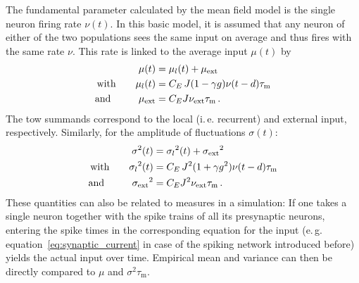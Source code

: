 The fundamental parameter calculated by the mean field model is the single neuron
firing rate $\nu(t)$. In this basic model, it is assumed that any neuron of either 
of the two populations sees the same input on average and thus fires with the same 
rate $\nu$. This rate is linked to the average input $\mu(t)$ by
\begin{equation}
    \begin{split}
        \mu(t)          &= \mu_l(t) + \mu_\text{ext} \\
        \text{with} \qquad \mu_l(t)        &= C_E \, J (1 - \gamma g) \nu(t - d) \tau_\text{m} \\
        \text{and~~\,} \qquad \mu_\text{ext}  &= C_E J \nu_\text{ext} \tau_\text{m} \,.
        \label{eq:mu}
    \end{split}
\end{equation}
The tow summands correspond to the local (i.\,e. recurrent) and 
external input, respectively.
Similarly, for the amplitude of fluctuations $\sigma(t)$:
\begin{equation}
    \begin{split}
        \sigma^2(t)     &= {\sigma_l}^2(t) + {\sigma_\text{ext}}^2 \\
        \text{with} \qquad      {\sigma_l}^2(t)       
                        &= C_E \, J^2 (1 + \gamma g^2) \nu(t - d) \tau_\text{m} \\
            \text{and~~\,}  \qquad    
        {\sigma_\text{ext}}^2  &= C_E J^2 \nu_\text{ext} \tau_\text{m} \,.
        \label{eq:sigma}
    \end{split}
\end{equation}
These quantities can also be related to measures in a simulation:
If one takes a single neuron together with the spike trains of all its
presynaptic neurons, entering the spike times in the corresponding 
equation for the input (e.\,g. equation~\eqref{eq:synaptic_current} in case of 
the spiking network introduced before) yields the actual input over time. 
Empirical mean and variance can then be directly compared to $\mu$ and 
$\sigma^2 \tau_\text{m} $.


